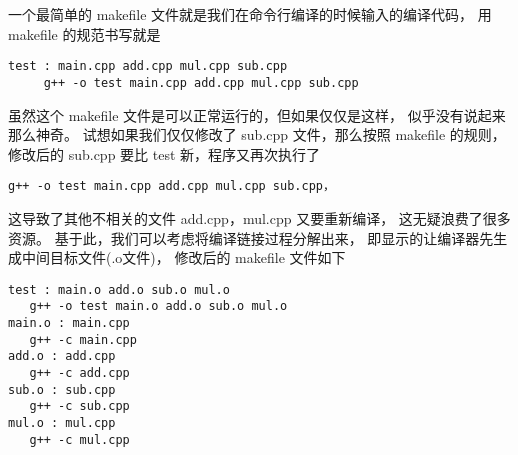 一个最简单的 makefile 文件就是我们在命令行编译的时候输入的编译代码，
用 makefile 的规范书写就是
\begin{verbatim}
test : main.cpp add.cpp mul.cpp sub.cpp
　　　g++ -o test main.cpp add.cpp mul.cpp sub.cpp
\end{verbatim}

虽然这个 makefile 文件是可以正常运行的，但如果仅仅是这样，
似乎没有说起来那么神奇。
试想如果我们仅仅修改了 sub.cpp 文件，那么按照 makefile 的规则，
修改后的 sub.cpp 要比 test 新，程序又再次执行了
\begin{verbatim}
g++ -o test main.cpp add.cpp mul.cpp sub.cpp，
\end{verbatim}
这导致了其他不相关的文件 add.cpp，mul.cpp 又要重新编译，
这无疑浪费了很多资源。
基于此，我们可以考虑将编译链接过程分解出来，
即显示的让编译器先生成中间目标文件(.o文件)，
修改后的 makefile 文件如下
\begin{verbatim}
test : main.o add.o sub.o mul.o
   g++ -o test main.o add.o sub.o mul.o
main.o : main.cpp
   g++ -c main.cpp
add.o : add.cpp
   g++ -c add.cpp
sub.o : sub.cpp
   g++ -c sub.cpp
mul.o : mul.cpp
   g++ -c mul.cpp
\end{verbatim}

